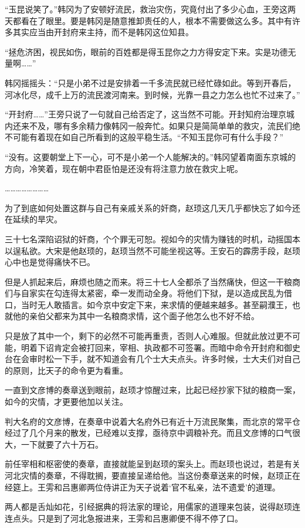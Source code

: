 “玉昆说笑了。”韩冈为了安顿好流民，救治灾伤，究竟付出了多少心血，王旁这两天都看在了眼里。要是韩冈是随意推卸责任的人，根本不需要做这么多。其中有许多其实应当由开封府来主持，而不是韩冈这位知县。

“拯危济困，视民如伤，眼前的百姓都是得玉昆你之力方得安定下来。实是功德无量啊……”

韩冈摇摇头：“只是小弟不过是安排着一千多流民就已经忙碌如此。等到开春后，河冰化尽，成千上万的流民渡河南来。到时候，光靠一县之力怎么也忙不过来了。”

“开封府……”王旁只说了一句就自己给否定了，这当然不可能。开封知府治理京城内还来不及，哪有多余精力像韩冈一般奔忙。如果只是简简单单的救灾，流民们绝不可能有着现在如自己所看到的这般平稳生活。“不知玉昆你可有什么手段？”

“没有。这要朝堂上下一心，可不是小弟一个人能解决的。”韩冈望着南面东京城的方向，冷笑着，现在朝中君臣怕是还没有将注意力放在救灾上呢。

……………………

为了到底如何处置这群与自己有亲戚关系的奸商，赵顼这几天几乎都快忘了如今还在延续的旱灾。

三十七名深陷诏狱的奸商，个个罪无可恕。视如今的灾情为赚钱的时机，动摇国本以逞私欲。大宋是他赵顼的，赵顼当然不可能坐视这等。王安石的霹雳手段，赵顼心中也是觉得痛快不已。

但是人抓起来后，麻烦也随之而来。将三十七人全都杀了当然痛快，但这一干粮商们与自家实在勾连得太紧密，牵一发而动全身。将他们下狱，是以造成民乱为借口，当时无人敢插言。如今京中安定下来，来求情的便越来越多。甚至嗣濮王，也就他的亲伯父都来为其中一名粮商求情，这个面子他怎么也不好不给。

只是放了其中一个，剩下的必然不可能再重责，否则人心难服。但就此放过更不可能，明着下诏肯定会被打回来，宰相、执政都不可签署。而暗中命令开封府和御史台在会审时松一下手，就不知道会有几个士大夫点头。许多时候，士大夫们对自己的原则，比天子的命令更为看重。

一直到文彦博的奏章送到眼前，赵顼才惊醒过来，比起已经抄家下狱的粮商一案，如今的灾情，才更要他加以关注。

判大名府的文彦博，在奏章中说着大名府外已有近十万流民聚集，而北京的常平仓经过了几个月来的散发，已经难以支撑，亟待京中调粮补充。而且文彦博的口气很大，一下就要了六十万石。

前任宰相和枢密使的奏章，直接就能呈到赵顼的案头上。而赵顼也说过，若是有关河北灾情的奏章，不得耽搁，要直接呈递给他。当这份奏章送来的时候，赵顼正在经筵上。王雱和吕惠卿两位侍讲正为天子说着‘官不私亲，法不遗爱’的道理。

两人都是舌灿如花，引经据典的将法家的理论，用儒家的道理来包装，说得赵顼连连点头。只是到了河北急报进来，王雱和吕惠卿便不得不停了口。

